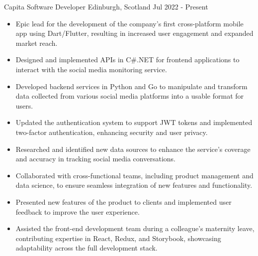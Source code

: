 
  \cventry
    {Capita} %
    {Software Developer} %
    {Edinburgh, Scotland} %
    {Jul 2022 - Present} %
    {
        \begin{itemize}
            \item Epic lead for the development of the company's first 
                cross-platform mobile app using Dart/Flutter, resulting in 
                increased user engagement and expanded market reach.
            \item Designed and implemented APIs in C\#.NET for frontend 
                applications to interact with the social media monitoring 
                service.
            \item Developed backend services in Python and Go to manipulate and 
                transform data collected from various social media platforms 
                into a usable format for users.
            \item Updated the authentication system to support JWT tokens and 
                implemented two-factor authentication, enhancing security and 
                user privacy.
            \item Researched and identified new data sources to enhance the 
                service's coverage and accuracy in tracking social media 
                conversations.
            \item Collaborated with cross-functional teams, including product 
                management and data science, to ensure seamless integration 
                of new features and functionality.
            \item Presented new features of the product to clients and 
                implemented user feedback to improve the user experience.
            \item Assisted the front-end development team during a colleague's 
                maternity leave, contributing expertise in React, Redux, and 
                Storybook, showcasing adaptability across the full development 
                stack.
        \end{itemize}
    }
